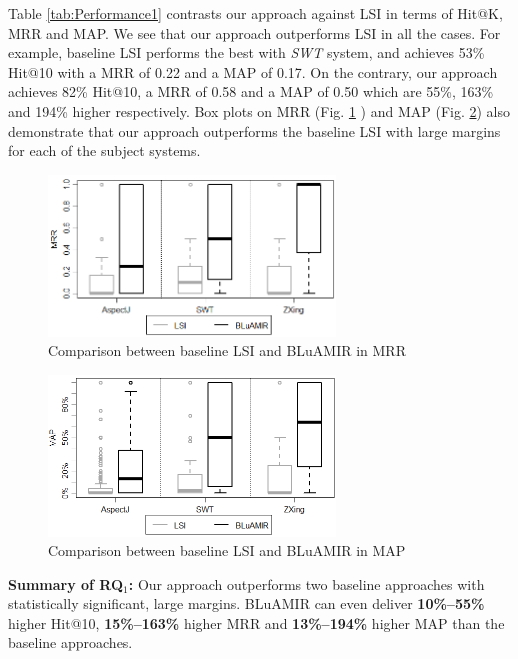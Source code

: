 \documentclass[conference]{IEEEtran}
\begin{document}
Table \ref{tab:Performance1} contrasts our approach against LSI in terms of Hit@K, MRR and MAP.
We see that our approach outperforms LSI in all the cases. For example, baseline LSI performs the best with \emph{SWT} system, and achieves 53\% Hit@10 with a MRR of 0.22 and a MAP of 0.17. On the contrary, our approach achieves 82\% Hit@10, a MRR of 0.58 and a MAP of 0.50 which are 55\%, 163\% and 194\% higher respectively. Box plots on MRR (Fig. \ref{box:LSI+AssoMRR} ) and MAP (Fig. \ref{box:LSI+Asso-MAP}) also demonstrate that our approach outperforms the baseline LSI with large margins for each of the subject systems.

\begin{figure}
	\centering
	\includegraphics[width=3in]{comapre-mrr}
		\vspace{-.3cm}
	\caption {Comparison between baseline LSI and BLuAMIR in MRR}
	\label{box:LSI+AssoMRR}
	\vspace{-.5cm}
\end{figure}
\begin{figure}
	\centering
	\includegraphics[width=3in]{compare-map-lsi-proposed}
		\vspace{-.3cm}
	\caption {Comparison between baseline LSI and BLuAMIR in MAP}
	\label{box:LSI+Asso-MAP}
	\vspace{-.5cm}
\end{figure}

\begin{framed}
	\noindent
	\textbf{Summary of RQ$_1$:} Our approach outperforms two baseline approaches \cite{vector-space-model,MarcusLSI} with statistically significant, large margins. BLuAMIR can even deliver \textbf{10\%--55\%} higher Hit@10, \textbf{15\%--163\%} higher MRR and \textbf{13\%--194\%} higher MAP than the baseline approaches.  
\end{framed}
   
\end{document}
